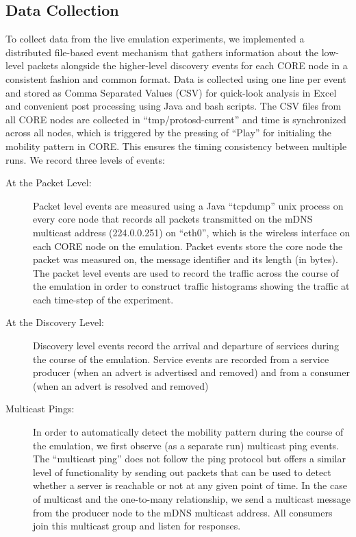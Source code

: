 \subsection{Data Collection}

To collect data from the live emulation experiments, we implemented a distributed file-based event mechanism that gathers information about the low-level packets alongside the higher-level discovery events for each CORE node in a consistent fashion and common format.  Data is collected using one line per event and stored as Comma Separated Values (CSV) for quick-look analysis in Excel and convenient post processing using Java and bash scripts. The CSV files from all CORE nodes are collected in ``tmp/protosd-current'' and time is synchronized across all nodes, which is triggered by the pressing of ``Play''  for initialing the mobility pattern in CORE. This ensures the timing consistency between multiple runs. We record three levels of events:

\begin{description}
\item [At the Packet Level: ] Packet level events are measured using a Java ``tcpdump'' unix process on every core node that records all packets transmitted on the mDNS multicast address (224.0.0.251) on ``eth0'', which is the wireless interface on each CORE node on the emulation.    Packet events store the core node the packet was measured on, the message identifier and its length (in bytes).   The packet level events are used to record the traffic across the course of the emulation in order to construct traffic histograms showing the traffic  at each time-step of the experiment. 

\item [At the Discovery Level: ] Discovery level events record the arrival and departure of services during the course of the emulation.  Service events are recorded from a service producer (when an advert is advertised and removed) and from a consumer (when an advert is resolved and removed)

\item [Multicast Pings: ] In order to automatically detect the mobility pattern during the course of the emulation, we first observe (as a separate run) multicast ping events.  The ``multicast ping'' does not follow the ping protocol but offers a similar level of functionality by sending out packets that can be used to detect whether a server is reachable or not at any given point of time.  In the case of multicast and the one-to-many relationship, we send a multicast message from the producer node to the mDNS multicast address.  All consumers join this multicast group and listen for responses.  
\end{description}


